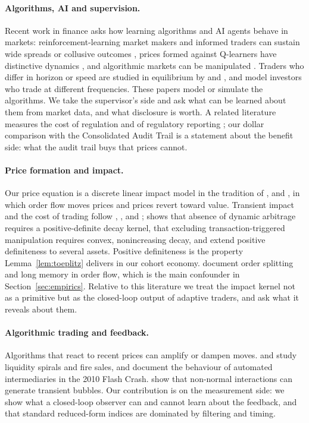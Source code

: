 \documentclass[12pt]{article}
\theoremstyle{definition}
\theoremstyle{remark}
\begin{document}
\paragraph{Algorithms, AI and supervision.} Recent work in finance asks how learning algorithms and AI agents behave in markets: reinforcement-learning market makers and informed traders can sustain wide spreads or collusive outcomes \citep{colliard2022,dou2025}, prices formed against Q-learners have distinctive dynamics \citep{banerjee2026}, and algorithmic markets can be manipulated \citep{tremacoldi2025}. Traders who differ in horizon or speed are studied in equilibrium by \citet{cespa2015} and \citet{biais2015}, and \citet{crouzet2020} model investors who trade at different frequencies. These papers model or simulate the algorithms. We take the supervisor's side and ask what can be learned about them from market data, and what disclosure is worth. A related literature measures the cost of regulation and of regulatory reporting \citep{trebbi2024}; our dollar comparison with the Consolidated Audit Trail is a statement about the benefit side: what the audit trail buys that prices cannot.

\paragraph{Price formation and impact.} Our price equation is a discrete linear impact model in the tradition of \citet{kyle1985}, \citet{glosten1985} and \citet{hasbrouck1991}, in which order flow moves prices and prices revert toward value. Transient impact and the cost of trading follow \citet{almgren2001}, \citet{obizhaeva2013}, \citet{gatheral2010} and \citet{bouchaud2004}; \citet{gatheral2010} shows that absence of dynamic arbitrage requires a positive-definite decay kernel, \citet{alfonsi2012} that excluding transaction-triggered manipulation requires convex, nonincreasing decay, and \citet{alfonsi2016} extend positive definiteness to several assets. Positive definiteness is the property Lemma~\ref{lem:toeplitz} delivers in our cohort economy. \citet{bouchaud2018} document order splitting and long memory in order flow, which is the main confounder in Section~\ref{sec:empirics}. Relative to this literature we treat the impact kernel not as a primitive but as the closed-loop output of adaptive traders, and ask what it reveals about them.

\paragraph{Algorithmic trading and feedback.} Algorithms that react to recent prices can amplify or dampen moves. \citet{brunnermeier2009} and \citet{shleifer1992} study liquidity spirals and fire sales, and \citet{kirilenko2017} document the behaviour of automated intermediaries in the 2010 Flash Crash. \citet{sornette2023} show that non-normal interactions can generate transient bubbles. Our contribution is on the measurement side: we show what a closed-loop observer can and cannot learn about the feedback, and that standard reduced-form indices are dominated by filtering and timing.
\end{document}
